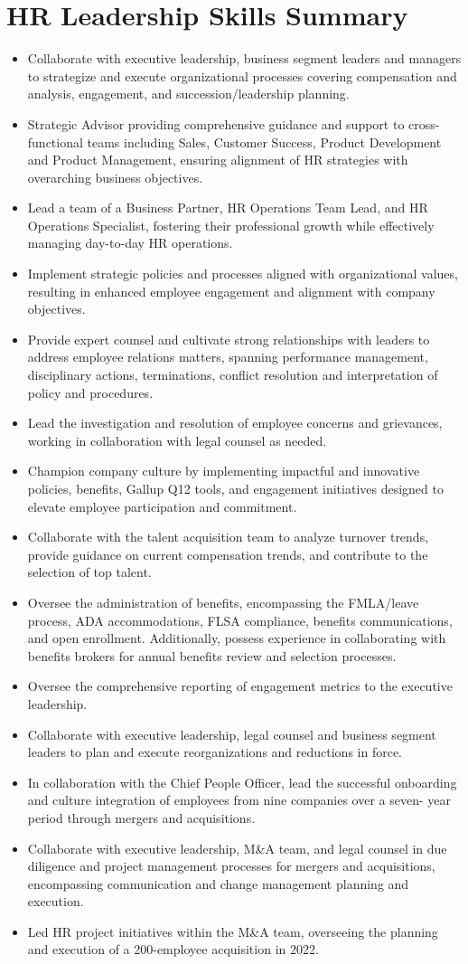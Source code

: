 \documentclass[letterpaper,11pt]{article}
\newcommand{\resumeItem}[1]{
  \item\small{
    {#1 \vspace{-2pt}}
  }
}
\newcommand{\resumeItemListStart}{\begin{itemize}}
\newcommand{\resumeItemListEnd}{\end{itemize}\vspace{-5pt}}
\begin{document}
\section{HR Leadership Skills Summary}
    \resumeItemListStart
        \resumeItem{Collaborate with executive leadership, business segment leaders and managers to strategize and execute organizational processes covering compensation and analysis, engagement, and succession/leadership planning.}
        \resumeItem{Strategic Advisor providing comprehensive guidance and support to cross-functional teams including Sales, Customer Success, Product Development and Product Management, ensuring alignment of HR strategies with overarching business objectives.}
        \resumeItem{Lead a team of a Business Partner, HR Operations Team Lead, and HR Operations Specialist, fostering their professional growth while effectively managing day-to-day HR operations.}
        \resumeItem{Implement strategic policies and processes aligned with organizational values, resulting in enhanced employee engagement and alignment with company objectives.}
        \resumeItem{Provide expert counsel and cultivate strong relationships with leaders to address employee relations matters, spanning performance management, disciplinary actions, terminations, conflict resolution and interpretation of policy and procedures.}
        \resumeItem{Lead the investigation and resolution of employee concerns and grievances, working in collaboration with legal counsel as needed.}
        \resumeItem{Champion company culture by implementing impactful and innovative policies, benefits, Gallup Q12 tools, and engagement initiatives designed to elevate employee participation and commitment.}
        \resumeItem{Collaborate with the talent acquisition team to analyze turnover trends, provide guidance on current compensation trends, and contribute to the selection of top talent.}
        \resumeItem{Oversee the administration of benefits, encompassing the FMLA/leave process, ADA accommodations, FLSA compliance, benefits communications, and open enrollment. Additionally, possess experience in collaborating with benefits brokers for annual benefits review and selection processes.}
        \resumeItem{Oversee the comprehensive reporting of engagement metrics to the executive leadership.}
        \resumeItem{Collaborate with executive leadership, legal counsel and business segment leaders to plan and execute reorganizations and reductions in force.}
        \resumeItem{In collaboration with the Chief People Officer, lead the successful onboarding and culture integration of employees from nine companies over a seven- year period through mergers and acquisitions.}
        \resumeItem{Collaborate with executive leadership, M\&A team, and legal counsel in due diligence and project management processes for mergers and acquisitions, encompassing communication and change management planning and execution.}
        \resumeItem{Led HR project initiatives within the M\&A team, overseeing the planning and execution of a 200-employee acquisition in 2022.}
    \resumeItemListEnd
\end{document}
